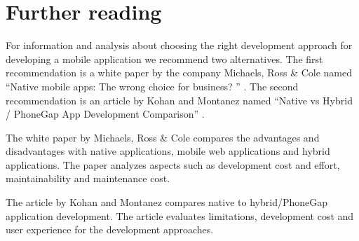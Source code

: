 \section{Further reading}\label{sec:further-reading}
For information and analysis about choosing the right development approach for developing a mobile application we recommend two alternatives. The first recommendation is a white paper by the company Michaels, Ross \& Cole named “Native mobile apps: The wrong choice for business? ” \cite{michaels2013}. The second recommendation is an article by Kohan and Montanez named “Native vs Hybrid / PhoneGap App Development Comparison” \cite{kohan2015}. 

The white paper by Michaels, Ross \& Cole compares the advantages and disadvantages with native applications, mobile web applications and hybrid applications. The paper analyzes aspects such as development cost and effort, maintainability and maintenance cost. 

The article by Kohan and Montanez compares native to hybrid/PhoneGap application development.  The article evaluates  limitations, development cost and user experience for the development approaches.